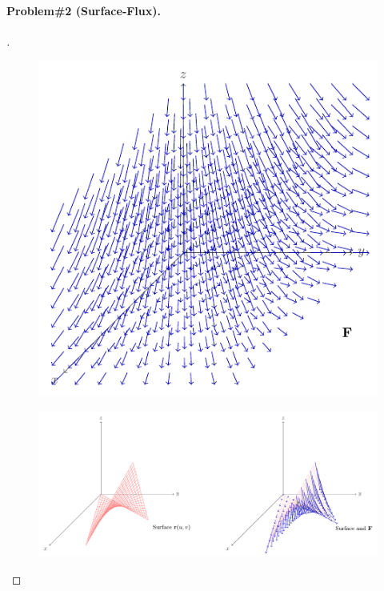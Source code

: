 \documentclass[11pt,openany]{article}
\begin{document}
\paragraph{{\color{magenta}Problem\;\#2} (Surface‐Flux).} 
\begin{proof}[\sol]
\ \\ 
\begin{figure}[h!]\centering
\includegraphics[scale=1]{../riemann-tikz/problem2_1.pdf}
\end{figure}
\begin{figure}[h!]\centering
\includegraphics[scale=1]{../riemann-tikz/problem2_2.pdf}
\end{figure}


\end{proof}
\end{document}
